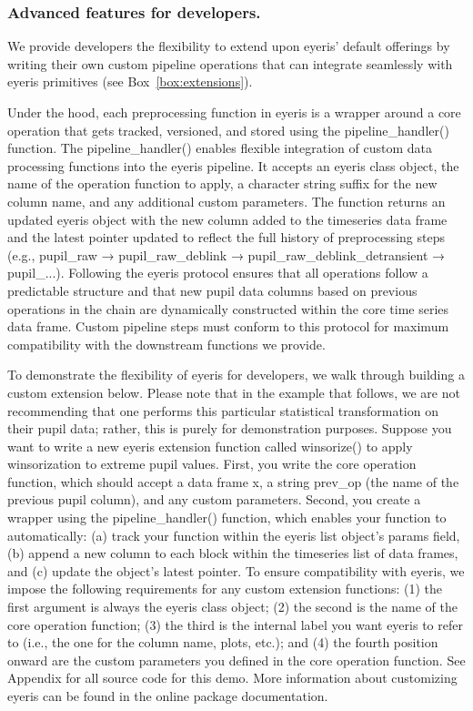 \subsubsection{Advanced features for developers.}\label{sec:dev-features}
We provide developers the flexibility to extend upon eyeris’ default offerings by writing their own custom pipeline operations that can integrate seamlessly with eyeris primitives (see Box~\ref{box:extensions}).

Under the hood, each preprocessing function in eyeris is a wrapper around a core operation that gets tracked, versioned, and stored using the pipeline\_handler() function. The pipeline\_handler() enables flexible integration of custom data processing functions into the eyeris pipeline. It accepts an eyeris class object, the name of the operation function to apply, a character string suffix for the new column name, and any additional custom parameters. The function returns an updated eyeris object with the new column added to the timeseries data frame and the latest pointer updated to reflect the full history of preprocessing steps (e.g., pupil\_raw → pupil\_raw\_deblink → pupil\_raw\_deblink\_detransient → pupil\_...). Following the eyeris protocol ensures that all operations follow a predictable structure and that new pupil data columns based on previous operations in the chain are dynamically constructed within the core time series data frame. Custom pipeline steps must conform to this protocol for maximum compatibility with the downstream functions we provide.

To demonstrate the flexibility of eyeris for developers, we walk through building a custom extension below. Please note that in the example that follows, we are not recommending that one performs this particular statistical transformation on their pupil data; rather, this is purely for demonstration purposes. Suppose you want to write a new eyeris extension function called winsorize() to apply winsorization to extreme pupil values. First, you write the core operation function, which should accept a data frame x, a string prev\_op (the name of the previous pupil column), and any custom parameters. Second, you create a wrapper using the pipeline\_handler() function, which enables your function to automatically: (a) track your function within the eyeris list object’s params field, (b) append a new column to each block within the timeseries list of data frames, and (c) update the object’s latest pointer. To ensure compatibility with eyeris, we impose the following requirements for any custom extension functions: (1) the first argument is always the eyeris class object; (2) the second is the name of the core operation function; (3) the third is the internal label you want eyeris to refer to (i.e., the one for the column name, plots, etc.); and (4) the fourth position onward are the custom parameters you defined in the core operation function. See Appendix for all source code for this demo. More information about customizing eyeris can be found in the online package documentation.

